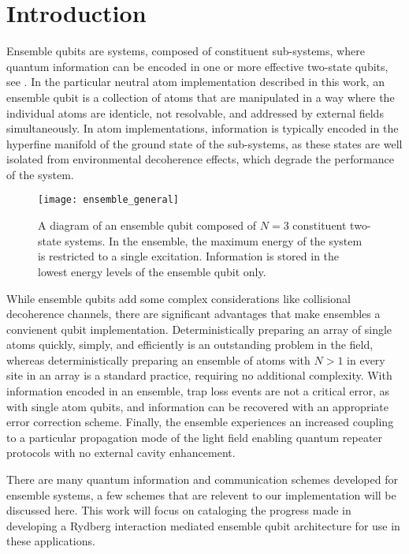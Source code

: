 \chapter{Introduction}\label{ch_intro}

Ensemble qubits are systems, composed of constituent sub-systems, where quantum information can be encoded in one or more effective two-state qubits\cite{LukinFleischhauerCoteEtAl2001,Brion2007}, see .
In the particular neutral atom implementation described in this work, an ensemble qubit is a collection of atoms that are manipulated in a way where the individual atoms are identicle, not resolvable, and addressed by external fields simultaneously.
In atom implementations, information is typically encoded in the hyperfine manifold of the ground state of the sub-systems, as these states are well isolated from environmental decoherence effects, which degrade the performance of the system.

\begin{figure}
  \centering
  \label{fig_ensemblegen}
  \texttt{[image: ensemble\_general]}
  \caption{
    A diagram of an ensemble qubit composed of $N=3$ constituent two-state systems.
    In the ensemble, the maximum energy of the system is restricted to a single excitation.
    Information is stored in the lowest energy levels of the ensemble qubit only.
  }
\end{figure}

While ensemble qubits add some complex considerations like collisional decoherence channels, there are significant advantages that make ensembles a convienent qubit implementation.
Deterministically preparing an array of single atoms quickly, simply, and efficiently is an outstanding problem in the field\cite{583606310,BakrPengTaiEtAl2010,Endres2016,Barredo1021,SerwaneZuernLompeEtAl2011}, whereas deterministically preparing an ensemble of atoms with $N>1$ in every site in an array is a standard practice, requiring no additional complexity.
With information encoded in an ensemble, trap loss events are not a critical error, as with single atom qubits, and information can be recovered with an appropriate error correction scheme\cite{Brion2007}.
Finally, the ensemble experiences an increased coupling to a particular propagation mode of the light field enabling quantum repeater protocols with no external cavity enhancement\cite{Pedersen2009}.

There are many quantum information and communication schemes developed for ensemble systems, a few schemes that are relevent to our implementation will be discussed here.
This work will focus on cataloging the progress made in developing a Rydberg interaction mediated ensemble qubit architecture for use in these applications.

